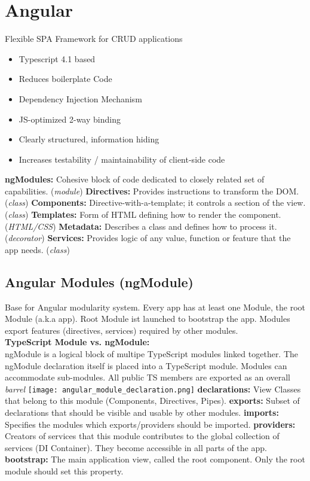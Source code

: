 
\section{Angular}
Flexible SPA Framework for CRUD applications
\begin{itemize}[topsep=0pt, leftmargin=3mm]
    \setlength\itemsep{-0.3em}
    \item Typescript 4.1 based
    \item Reduces boilerplate Code
    \item Dependency Injection Mechanism
    \item JS-optimized 2-way binding
    \item Clearly structured, information hiding
    \item Increases testability / maintainability of client-side code
\end{itemize}
\textcolor{b}{\textbf{ngModules:}} Cohesive block of code dedicated to closely related set of capabilities. (\textit{module})
\textcolor{b}{\textbf{Directives:}} Provides instructions to transform the DOM. (\textit{class})
\textcolor{b}{\textbf{Components:}} Directive-with-a-template; it controls a section of the view. (\textit{class})
\textcolor{b}{\textbf{Templates:}} Form of HTML defining how to render the component. (\textit{HTML/CSS})
\textcolor{b}{\textbf{Metadata:}} Describes a class and defines how to process it. (\textit{decorator})
\textcolor{b}{\textbf{Services:}} Provides logic of any value, function or feature that the app needs. (\textit{class})
\subsection{Angular Modules (ngModule)}
Base for Angular modularity system. Every app has at least one Module, the root Module (a.k.a app). Root Module ist launched to bootstrap the app. Modules export features (directives, services) required by other modules.\\
\textcolor{b}{\textbf{TypeScript Module vs. ngModule:}}\\
ngModule is a logical block of multipe TypeScript modules linked together. The ngModule declaration itself is placed into a TypeScript module. Modules can accommodate sub-modules. All public TS members are exported as an overall \textit{barrel}
\texttt{[image: angular\_module\_declaration.png]}
\textbf{declarations:} View Classes that belong to this module (Components, Directives, Pipes). \textbf{exports:} Subset of declarations that should be visible and usable by other modules. \textbf{imports:} Specifies the modules which exports/providers should be imported. \textbf{providers:} Creators of services that this module contributes to the global collection of services (DI Container). They become accessible in all parts of the app. \textbf{bootstrap:} The main application view, called the root component. Only the root module should set this property.
